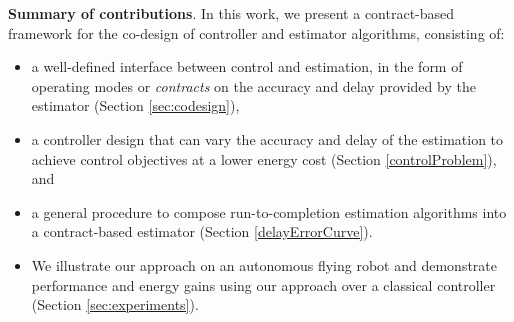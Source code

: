 \textbf{Summary of contributions}.
In this work, we present a contract-based framework for the co-design of controller and estimator algorithms, consisting of:
\begin{itemize}
	\item a well-defined interface between control and estimation, in the form of operating modes or \emph{contracts} on the accuracy and delay provided by the estimator (Section \ref{sec:codesign}),
	\item a controller design that can vary the accuracy and delay of the estimation to achieve control objectives at a lower energy cost (Section \ref{controlProblem}), and
	\item a general procedure to compose run-to-completion estimation algorithms into a contract-based estimator (Section \ref{delayErrorCurve}).
	\item We illustrate our approach on an autonomous flying robot and demonstrate performance and energy gains using our approach over a classical controller (Section \ref{sec:experiments}).
\end{itemize}
